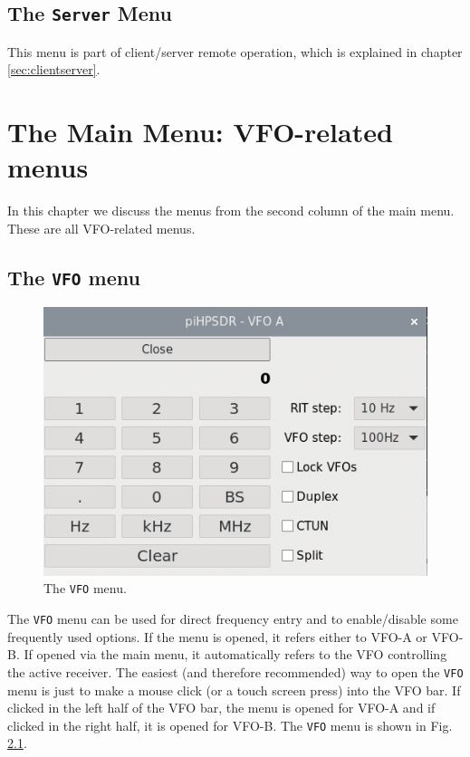 \documentclass[12pt]{book}
\def\bltt#1{\texttt{\color{blue}#1}}
\begin{document}
\section{The \texttt{Server} Menu}
This menu is part of client/server remote operation, which is explained in chapter \ref{sec:clientserver}.
\chapter[VFO-related menus]{The Main Menu: VFO-related menus}

In this chapter we discuss the menus from the second column
of the main menu. These are all VFO-related menus.


\section{The \texttt{VFO}  menu}
\label{sec:vfomenu}

\begin{figure}[ht]
\center
\includegraphics[scale=0.45]{VFOmenu.png}
\caption{The \bltt{VFO} menu.}
\label{fig:VFOmenu}
\end{figure}

The \bltt{VFO} menu can be used for direct frequency entry and to
enable/disable some frequently used options. If the menu is opened,
it refers either to VFO-A or VFO-B. If opened via the main menu,
it automatically refers to the VFO controlling the active receiver.
The easiest (and therefore recommended) way to open the \bltt{VFO}
menu is just to make a mouse click (or a touch screen press) into the
VFO bar. If clicked in the left half of the VFO bar, the menu is opened
for VFO-A and if clicked in the right half, it is opened for VFO-B.
The \bltt{VFO} menu is shown in Fig. \ref{fig:VFOmenu}.
\end{document}
